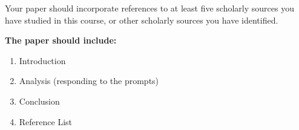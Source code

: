 \documentclass[
]{book}
\providecommand{\tightlist}{%
  \setlength{\itemsep}{0pt}\setlength{\parskip}{0pt}}
\begin{document}
\begin{assessment}
Your paper should incorporate references to at least five scholarly sources you have studied in this course, or other scholarly sources you have identified.

\textbf{The paper should include:}

\begin{enumerate}
\def\labelenumi{\arabic{enumi}.}
\tightlist
\item
  Introduction\\
\item
  Analysis (responding to the prompts)\\
\item
  Conclusion\\
\item
  Reference List
\end{enumerate}
\end{assessment}
\end{document}
